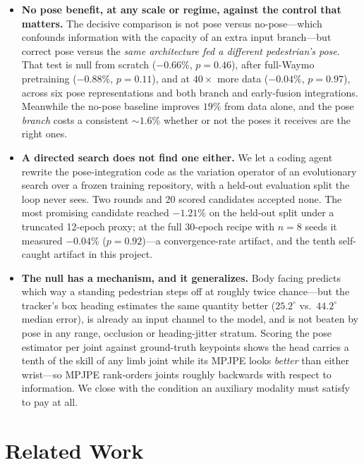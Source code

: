 \documentclass{article} %
\begin{document}
\begin{itemize}
  \item \textbf{No pose benefit, at any scale or regime, against the control that
        matters.} The decisive comparison is not pose versus no-pose---which
        confounds information with the capacity of an extra input branch---but
        correct pose versus the \emph{same architecture fed a different
        pedestrian's pose}. That test is null from scratch ($-0.66\%$, $p{=}0.46$),
        after full-Waymo pretraining ($-0.88\%$, $p{=}0.11$), and at $40\times$ more
        data ($-0.04\%$, $p{=}0.97$), across six pose representations and both
        branch and early-fusion integrations. Meanwhile the no-pose baseline
        improves $19\%$ from data alone, and the pose \emph{branch} costs a
        consistent ${\sim}1.6\%$ whether or not the poses it receives are the right
        ones.
  \item \textbf{A directed search does not find one either.} We let a coding agent
        rewrite the pose-integration code as the variation operator of an
        evolutionary search over a frozen training repository, with a held-out
        evaluation split the loop never sees. Two rounds and 20 scored candidates
        accepted none. The most promising candidate reached $-1.21\%$ on the
        held-out split under a truncated 12-epoch proxy; at the full 30-epoch recipe
        with $n{=}8$ seeds it measured $-0.04\%$ ($p{=}0.92$)---a convergence-rate
        artifact, and the tenth self-caught artifact in this project.
  \item \textbf{The null has a mechanism, and it generalizes.} Body facing predicts
        which way a standing pedestrian steps off at roughly twice chance---but the
        tracker's box heading estimates the same quantity better
        ($25.2^\circ$ vs.\ $44.2^\circ$ median error), is already an input channel to
        the model, and is not beaten by pose in any range, occlusion or heading-jitter
        stratum. Scoring the pose estimator per joint against ground-truth keypoints
        shows the head carries a tenth of the skill of any limb joint while its MPJPE
        looks \emph{better} than either wrist---so MPJPE rank-orders joints roughly
        backwards with respect to information. We close with the condition an
        auxiliary modality must satisfy to pay at all.
\end{itemize}

\section{Related Work}
\label{sec:related}
\end{document}
